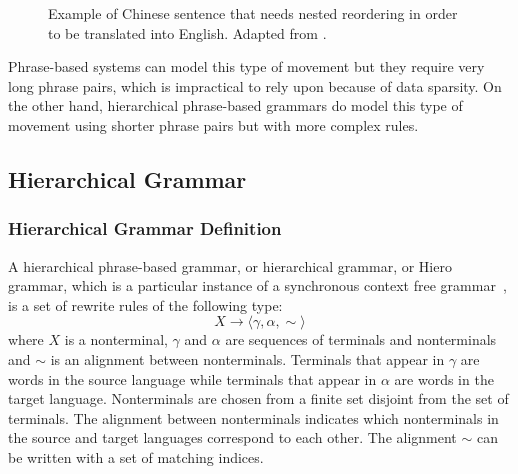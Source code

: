 \begin{CJK}{UTF8}{gbsn}
\begin{figure}
\begin{center}
\begin{footnotesize}
    \end{footnotesize}
  \end{center}
  \caption{Example of Chinese sentence that needs nested reordering in order to be translated into English.
  Adapted from \citep{chiang:2007:CL}.}
  \label{fig:exampleHiero}
\end{figure}
\end{CJK}  
%
Phrase-based systems can model this type of movement but
they require very long phrase pairs, which is
impractical to rely upon because of data sparsity. On the other
hand, hierarchical phrase-based grammars do model this type of movement using
shorter phrase pairs but with more complex rules.

\subsection{Hierarchical Grammar}
\label{sec:hiergrammar}

\subsubsection{Hierarchical Grammar Definition}

A hierarchical phrase-based grammar, or hierarchical grammar, or Hiero grammar,
which is a particular instance of a synchronous context free
grammar~\citep{lewis-stearns:1968:JACM,aho:1969:JCSS}, is
a set of rewrite rules of the following type:
%
\begin{equation}
  X \rightarrow \langle \gamma, \alpha, \sim \rangle \nonumber
\end{equation}
%
where $X$ is a nonterminal, $\gamma$ and $\alpha$ are sequences of terminals and nonterminals and $\sim$ is an alignment
between nonterminals. Terminals that appear in $\gamma$ are words in the source language while terminals that appear in $\alpha$ are
words in the target language. Nonterminals are chosen from a finite set disjoint from the set of terminals. The alignment between nonterminals
indicates which nonterminals in the source and target languages correspond to each other. The alignment $\sim$ can be written with 
a set of matching indices.

